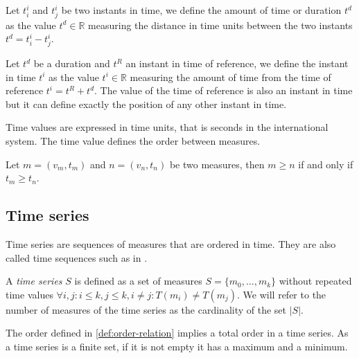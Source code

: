 \begin{definition}[Time]
  \label{def:time}
  Let $t^i_i$ and $t^i_j$ be two instants in time, we define the
  amount of time or duration $t^d$ as the value $t^d \in\mathbb{R}$
  measuring the distance in time units between the two instants $t^d =
  t^i_i - t^i_j$.

  Let $t^d$ be a duration and $t^{R}$ an instant in time of reference,
  we define the instant in time $t^i$ as the value $t^i \in\mathbb{R}$
  measuring the amount of time from the time of reference $t^i= t^{R}
  + t^d$. The value of the time of reference is also an instant in
  time but it can define exactly the position of any other instant in
  time.

\end{definition}

Time values are expressed in time units, that is seconds in the international system. The time value defines the order between measures.

\begin{definition}
  \label{def:order-relation}
  Let $m=(v_m,t_m)$ and $n=(v_n,t_n)$ be two measures, then $m\geq n$
  if and only if $t_m\geq t_n$.
\end{definition}

\subsection{Time series}

Time series are sequences of measures that are ordered in time. They
are also called time sequences such as in \cite{last:hetland}.

\begin{definition}
  A \emph{time series} $S$ is defined as a set of measures
  $S=\{m_0,\ldots,m_k\}$ without repeated time values $\forall i,j:
  i\leq k, j\leq k, i\neq j : T(m_i)\neq T(m_j)$. We will refer to the
  number of measures of the time series as the cardinality of the set
  $|S|$.
\end{definition}

The order defined in \ref{def:order-relation} implies a total order in
a time series. As a time series is a finite set, if it is not empty it
has a maximum and a minimum. 

